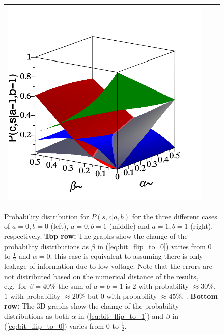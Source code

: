 \begin{figure}
\begin{tabular}{ccc}
        \includegraphics[width=.3\textwidth]{media/noisy_half_adder_value_full_dist_11.png} \\        
    \end{tabular}
    \caption{Probability distribution for $P(s,c|a,b)$ for the three different cases of $a=0, b=0$ (left), $a=0, b=1$ (middle) and $a=1, b=1$ (right), respectively. {\bf Top row:} The graphs show the change of the probability distributions as $\beta$ in (\ref{eq:bit_flip_to_0}) varies from $0$ to $\frac{1}{2}$ and $\alpha = 0$; this case is equivalent to assuming there is only leakage of information due to low-voltage. Note that the errors are not distributed based on the numerical distance of the results, e.g.\ for $\beta=40\%$ the sum of $a=b=1$ is $2$ with probability $\approx 30\%$, $1$ with probability $\approx 20\%$ but $0$ with probability $\approx 45\%$. \label{fig:noise_prob_dist}. {\bf Bottom row:} The 3D graphs show the change of the probability distributions as both $\alpha$ in (\ref{eq:bit_flip_to_1}) and $\beta$ in (\ref{eq:bit_flip_to_0}) varies from $0$ to $\frac{1}{2}$.}
\end{figure}



